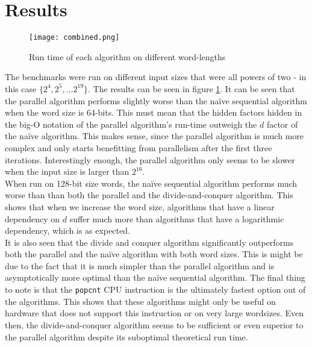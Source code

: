 \section{Results}
\begin{figure}
    \centering
    \texttt{[image: combined.png]}
    \caption{Run time of each algorithm on different word-lengths}
    \label{fig:runtime}
\end{figure}
The benchmarks were run on different input sizes that were all powers of two - in this case $\{2^4, 2^5, \dots 2^{19}\}$. The results can be seen in figure \ref{fig:runtime}. It can be seen that the parallel algorithm performs slightly worse than the naïve sequential algorithm when the word size is 64-bits. This must mean that the hidden factors hidden in the big-O notation of the parallel algorithm's run-time outweigh the $d$ factor of the naïve algorithm. This makes sense, since the parallel algorithm is much more complex and only starts benefitting from parallelism after the first three iterations. Interestingly enough, the parallel algorithm only seems to be slower when the input size is larger than $2^{16}$.\\
When run on 128-bit size words, the naïve sequential algorithm performs much worse than than both the parallel and the divide-and-conquer algorithm. This shows that when we increase the word size, algorithms that have a linear dependency on $d$ suffer much more than algorithms that have a logarithmic dependency, which is as expected.\\
It is also seen that the divide and conquer algorithm significantly outperforms both the parallel and the naïve algorithm with both word sizes. This is might be due to the fact that it is much simpler than the parallel algorithm and is asymptotically more optimal than the naïve sequential algorithm.
The final thing to note is that the \texttt{popcnt} CPU instruction is the ultimately fastest option out of the algorithms. This shows that these algorithms might only be useful on hardware that does not support this instruction or on very large wordsizes. Even then, the divide-and-conquer algorithm seems to be sufficient or even superior to the parallel algorithm despite its suboptimal theoretical run time.\\

